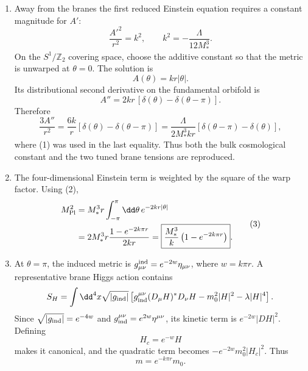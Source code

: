 \begin{enumerate}
  \begin{enumerate}
    \item Away from the branes the first reduced Einstein equation requires
      a constant magnitude for \(A'\):
      \[
        \frac{A'^2}{r^2}=k^2,
        \qquad
        \boxed{k^2=-\frac{\Lambda}{12M_*^3}}.
      \tag{1}
      \]
      On the \(S^1/\mathbb Z_2\) covering space, choose the additive
      constant so that the metric is unwarped at \(\theta=0\).  The
      solution is
      \[
        \boxed{A(\theta)=kr|\theta|.}
      \tag{2}
      \]
      Its distributional second derivative on the fundamental orbifold is
      \[
        A''=2kr\,[\delta(\theta)-\delta(\theta-\pi)].
      \]
      Therefore
      \[
        \frac{3A''}{r^2}
          =\frac{6k}{r}[\delta(\theta)-\delta(\theta-\pi)]
          =\frac{\Lambda}{2M_*^3kr}
             [\delta(\theta-\pi)-\delta(\theta)],
      \]
      where (1) was used in the last equality.  Thus both the bulk
      cosmological constant and the two tuned brane tensions are reproduced.

    \item The four-dimensional Einstein term is weighted by the square of
      the warp factor.  Using (2),
      \[
      \begin{split}
        M_{\rm Pl}^2
          &=M_*^3r\int_{-\pi}^{\pi}\dd\theta\,e^{-2kr|\theta|}\\
          &=2M_*^3r\frac{1-e^{-2k\pi r}}{2kr}
           =\boxed{\frac{M_*^3}{k}
             \left(1-e^{-2k\pi r}\right)}.
      \end{split}
      \tag{3}
      \]

    \item At \(\theta=\pi\), the induced metric is
      \(g^{\rm ind}_{\mu\nu}=e^{-2w}\eta_{\mu\nu}\), where
      \(w=k\pi r\).  A representative brane Higgs action contains
      \[
        S_H=\int \dd^4x\sqrt{|g_{\rm ind}|}
        \left[g_{\rm ind}^{\mu\nu}(D_\mu H)^*D_\nu H
              -m_0^2|H|^2-\lambda|H|^4\right].
      \]
      Since \(\sqrt{|g_{\rm ind}|}=e^{-4w}\) and
      \(g_{\rm ind}^{\mu\nu}=e^{2w}\eta^{\mu\nu}\), its kinetic term is
      \(e^{-2w}|DH|^2\).  Defining
      \[
        H_c=e^{-w}H
      \]
      makes it canonical, and the quadratic term becomes
      \(-e^{-2w}m_0^2|H_c|^2\).  Thus
      \[
        \boxed{m=e^{-k\pi r}m_0.}
      \tag{4}
      \]


\end{enumerate}
\end{enumerate}
